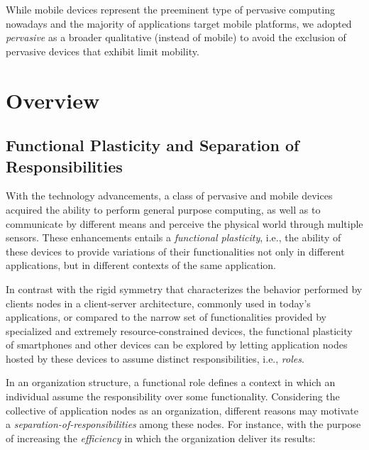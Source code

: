 While mobile devices represent the preeminent type of pervasive computing nowadays and the majority of applications target mobile platforms, we adopted \textit{pervasive} as a broader qualitative (instead of mobile) to avoid the exclusion of pervasive devices that exhibit limit mobility. 

\section{Overview}\label{sec:overview}

\subsection{Functional Plasticity and Separation of Responsibilities}


With the technology advancements, a class of pervasive and mobile devices acquired the ability to perform general purpose computing, as well as to communicate by different means and perceive the physical world through multiple sensors. These enhancements entails a \textit{functional plasticity}, i.e., the ability of these devices to provide variations of their functionalities not only in different applications, but in different contexts of the same application. 

In contrast with the rigid symmetry that characterizes the behavior performed by clients nodes in a client-server architecture, commonly used in today's applications, or compared to the narrow set of functionalities provided by specialized and extremely resource-constrained devices, the functional plasticity of smartphones and other devices can be explored by letting application nodes hosted by these devices to assume distinct responsibilities, i.e., \textit{roles}.

In an organization structure, a functional role defines a context in which an individual assume the responsibility over some functionality. 
Considering the collective of application nodes as an organization, different reasons may motivate a \textit{separation-of-responsibilities} among these nodes. 
For instance, with the purpose of increasing the \textit{efficiency} in which the organization deliver its results:

